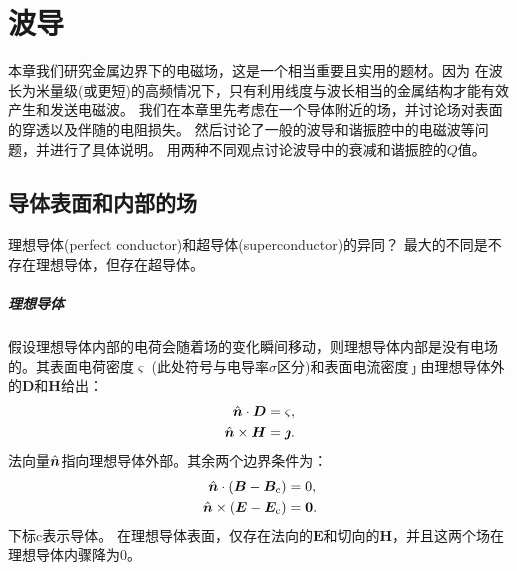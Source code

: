 \chapter{波导}
\label{chap:waveguide}
本章我们研究金属边界下的电磁场，这是一个相当重要且实用的题材。因为
在波长为米量级(或更短)的高频情况下，只有利用线度与波长相当的金属结构才能有效产生和发送电磁波。
我们在本章里先考虑在一个导体附近的场，并讨论场对表面的穿透以及伴随的电阻损失。
然后讨论了一般的波导和谐振腔中的电磁波等问题，并进行了具体说明。
用两种不同观点讨论波导中的衰减和谐振腔的$Q$值。

\section{导体表面和内部的场}
理想导体(perfect conductor)和超导体(superconductor)的异同？
最大的不同是不存在理想导体，但存在超导体。

\paragraph{理想导体}


假设理想导体内部的电荷会随着场的变化瞬间移动，则理想导体内部是没有电场的。其表面电荷密度$\varsigma$ (此处符号与电导率$\sigma$区分)和表面电流密度$\bm\jmath$由理想导体外的$\bm D$和$\bm H$给出：
\begin{subequations}
    \begin{align}
        \hat{\bm{n}}\cdot\bm D&=\varsigma,\\
        \hat{\bm{n}}\times\bm H&=\bm\jmath.
    \end{align}
\end{subequations}
法向量$\hat{\bm{n}}$指向理想导体外部。其余两个边界条件为：
\begin{subequations}
    \begin{align}
        \hat{\bm{n}}\cdot(\bm B-\bm B_\text c)&=0,\\
        \hat{\bm{n}}\times(\bm E-\bm E_\text c)&=\bm 0.
    \end{align}
\end{subequations}
下标c表示导体。
在理想导体表面，仅存在法向的$\bm E$和切向的$\bm H$，并且这两个场在理想导体内骤降为0。

